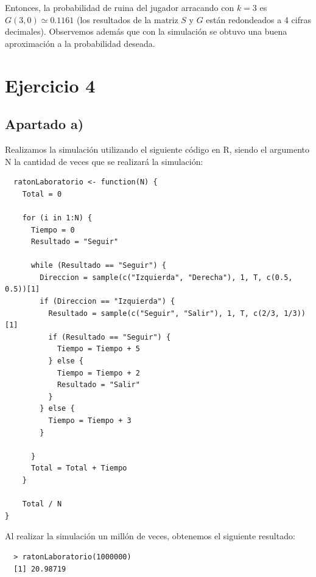\documentclass[11pt]{article}
\begin{document}
Entonces, la probabilidad de ruina del jugador arracando con $ k = 3 $ es $ G(3, 0) \simeq 0.1161 $ (los resultados de la 
matriz $S$ y $G$ están redondeados a 4 cifras decimales). Observemos además que con la simulación
se obtuvo una buena aproximación a la probabilidad deseada.


\section{Ejercicio 4}

\subsection*{Apartado a)}

Realizamos la simulación utilizando el siguiente código en R, siendo el 
argumento N la cantidad de veces que se realizará la simulación:

\begin{verbatim}
  ratonLaboratorio <- function(N) {
    Total = 0

    for (i in 1:N) {
      Tiempo = 0
      Resultado = "Seguir"

      while (Resultado == "Seguir") {
        Direccion = sample(c("Izquierda", "Derecha"), 1, T, c(0.5, 0.5))[1]
        if (Direccion == "Izquierda") {
          Resultado = sample(c("Seguir", "Salir"), 1, T, c(2/3, 1/3))[1]
          if (Resultado == "Seguir") {
            Tiempo = Tiempo + 5
          } else {
            Tiempo = Tiempo + 2
            Resultado = "Salir"
          }
        } else {
          Tiempo = Tiempo + 3
        }

      }
      Total = Total + Tiempo
    }
  
    Total / N
}
\end{verbatim}

Al realizar la simulación un millón de veces, obtenemos el siguiente resultado:

\begin{verbatim}
  > ratonLaboratorio(1000000)
  [1] 20.98719
\end{verbatim}

\end{document}
